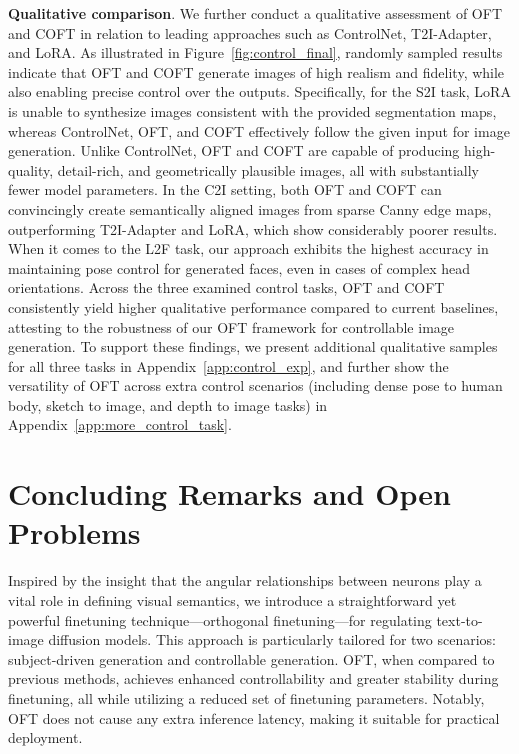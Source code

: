 {\textbf{Qualitative comparison}. We further conduct a qualitative assessment of OFT and COFT in relation to leading approaches such as ControlNet, T2I-Adapter, and LoRA. As illustrated in Figure~\ref{fig:control_final}, randomly sampled results indicate that OFT and COFT generate images of high realism and fidelity, while also enabling precise control over the outputs. Specifically, for the S2I task, LoRA is unable to synthesize images consistent with the provided segmentation maps, whereas ControlNet, OFT, and COFT effectively follow the given input for image generation. Unlike ControlNet, OFT and COFT are capable of producing high-quality, detail-rich, and geometrically plausible images, all with substantially fewer model parameters. In the C2I setting, both OFT and COFT can convincingly create semantically aligned images from sparse Canny edge maps, outperforming T2I-Adapter and LoRA, which show considerably poorer results. When it comes to the L2F task, our approach exhibits the highest accuracy in maintaining pose control for generated faces, even in cases of complex head orientations. Across the three examined control tasks, OFT and COFT consistently yield higher qualitative performance compared to current baselines, attesting to the robustness of our OFT framework for controllable image generation. To support these findings, we present additional qualitative samples for all three tasks in Appendix~\ref{app:control_exp}, and further show the versatility of OFT across extra control scenarios (including dense pose to human body, sketch to image, and depth to image tasks) in Appendix~\ref{app:more_control_task}.

\section{Concluding Remarks and Open Problems}

Inspired by the insight that the angular relationships between neurons play a vital role in defining visual semantics, we introduce a straightforward yet powerful finetuning technique—orthogonal finetuning—for regulating text-to-image diffusion models. This approach is particularly tailored for two scenarios: subject-driven generation and controllable generation. OFT, when compared to previous methods, achieves enhanced controllability and greater stability during finetuning, all while utilizing a reduced set of finetuning parameters. Notably, OFT does not cause any extra inference latency, making it suitable for practical deployment.

}
